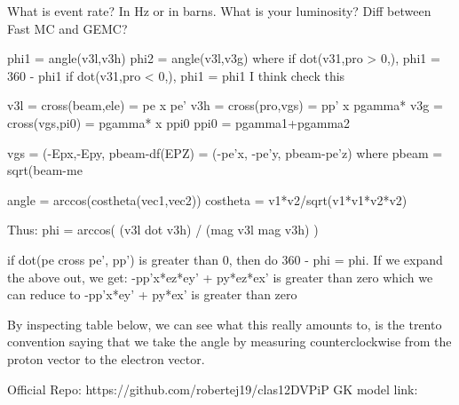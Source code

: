     What is event rate? In Hz or in barns. What is your luminosity?
    Diff between Fast MC and GEMC?

            

phi1 = angle(v3l,v3h)
phi2 = angle(v3l,v3g)
where if dot(v31,pro > 0,), phi1 =  360 - phi1
if  dot(v31,pro < 0,), phi1 =  phi1 I think check this

v3l = cross(beam,ele) = pe x pe'
v3h = cross(pro,vgs) = pp' x pgamma*
v3g = cross(vgs,pi0) = pgamma* x ppi0
ppi0 = pgamma1+pgamma2

vgs = (-Epx,-Epy, pbeam-df(EPZ) = (-pe'x, -pe'y, pbeam-pe'z) where pbeam = sqrt(beam-me%

angle = arccos(costheta(vec1,vec2))
costheta = v1*v2/sqrt(v1*v1*v2*v2)

Thus:
phi = arccos( (v3l dot v3h) / (mag v3l mag v3h) ) 


if dot(pe cross pe', pp') is greater than 0, then do 360 - phi = phi.
If we expand the above out, we get:
-pp'x*ez*ey' + py*ez*ex' is greater than zero
which we can reduce to 
-pp'x*ey' + py*ex' is greater than zero

By inspecting table below, we can see what this really amounts to, is the trento convention saying that we take the angle by measuring counterclockwise from the proton vector to the electron vector.


Official Repo: https://github.com/robertej19/clas12DVPiP
GK model link: 

